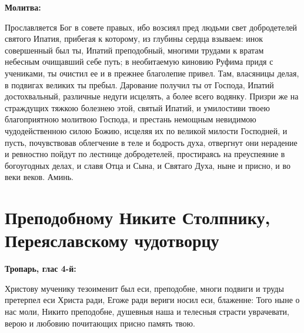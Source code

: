\medskip


\bfseries Молитва:\normalfont{}\nopagebreak


Прославляется Бог в совете правых, ибо возсиял пред людьми свет добродетелей святого Ипатия, прибегая к которому, из глубины сердца взываем: инок совершенный был ты, Ипатий преподобный, многими трудами к вратам небесным очищавший себе путь; в необитаемую киновию Руфима придя с учениками, ты очистил ее и в прежнее благолепие привел. Там, власяницы делая, в подвигах великих ты пребыл. Дарование получил ты от Господа, Ипатий достохвальный, различные недуги исцелять, а более всего водянку. Призри же на страждущих тяжкою болезнею этой, святый Ипатий, и умилостиви твоею благоприятною молитвою Господа, и престань немощным невидимою чудодейственною силою Божию, исцеляя их по великой милости Господней, и пусть, почувствовав облегчение в теле и бодрость духа, отвергнут они нерадение и ревностно пойдут по лестнице добродетелей, простираясь на преуспеяние в богоугодных делах, и славя Отца и Сына, и Святаго Духа, ныне и присно, и во веки веков. Аминь.


\bigskip\bigskip\mychapterending


 

\section{Преподобному Никите Столпнику, Переяславскому чудотворцу}
 


\bfseries Тропарь, глас 4-й:\normalfont{}\nopagebreak


Христову мученику тезоименит был еси, преподобне, многи подвиги и труды претерпел еси Христа ради, Егоже ради вериги носил еси, блаженне: Того ныне о нас моли, Никито преподобне, душевныя наша и телесныя страсти уврачевати, верою и любовию почитающих присно память твою.


\medskip


